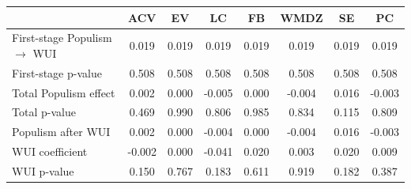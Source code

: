 \begin{tabular}{lccccccc}
\toprule
 & ACV & EV & LC & FB & WMDZ & SE & PC \\
\midrule
First-stage Populism $\rightarrow$ WUI & 0.019 & 0.019 & 0.019 & 0.019 & 0.019 & 0.019 & 0.019 \\
First-stage p-value & 0.508 & 0.508 & 0.508 & 0.508 & 0.508 & 0.508 & 0.508 \\
Total Populism effect & 0.002 & 0.000 & -0.005 & 0.000 & -0.004 & 0.016 & -0.003 \\
Total p-value & 0.469 & 0.990 & 0.806 & 0.985 & 0.834 & 0.115 & 0.809 \\
Populism after WUI & 0.002 & 0.000 & -0.004 & 0.000 & -0.004 & 0.016 & -0.003 \\
WUI coefficient & -0.002 & 0.000 & -0.041 & 0.020 & 0.003 & 0.020 & 0.009 \\
WUI p-value & 0.150 & 0.767 & 0.183 & 0.611 & 0.919 & 0.182 & 0.387 \\
\bottomrule
\end{tabular}
